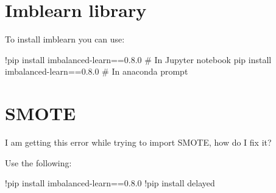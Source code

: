 	\section{Imblearn library}
To install imblearn you can use:
	\begin{code}[\codenumbering]{}
		\codeitemnonumber !pip install imbalanced-learn==0.8.0 \# In Jupyter notebook
		\codeitemnonumber pip install imbalanced-learn==0.8.0 \# In anaconda prompt
	\end{code}


	\section{SMOTE}
I am getting this error while trying to import SMOTE, how do I fix it?

\noindent{}

Use the following:
	\begin{code}[\codenumbering]{}
		\codeitemnonumber !pip install imbalanced-learn==0.8.0
		\codeitemnonumber !pip install delayed
	\end{code}
